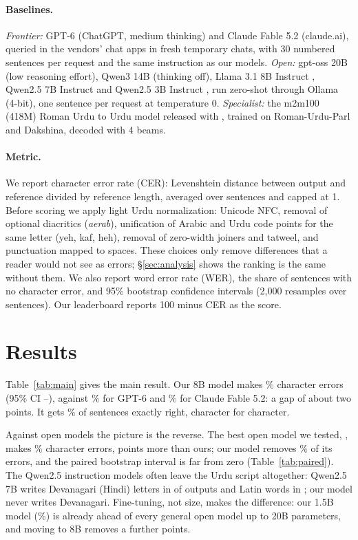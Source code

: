 \documentclass[11pt]{article}
\begin{document}
\paragraph{Baselines.} \emph{Frontier:} GPT-6 (ChatGPT, medium thinking) and Claude Fable 5.2 (claude.ai), queried in the vendors' chat apps in fresh temporary chats, with 30 numbered sentences per request and the same instruction as our models. \emph{Open:} gpt-oss 20B (low reasoning effort), Qwen3 14B \citep{yang2025qwen3} (thinking off), Llama 3.1 8B Instruct \citep{grattafiori2024llama3}, Qwen2.5 7B Instruct and Qwen2.5 3B Instruct \citep{qwen2025qwen25}, run zero-shot through Ollama (4-bit), one sentence per request at temperature 0. \emph{Specialist:} the m2m100 (418M) Roman Urdu to Urdu model released with \citet{butt2025translit}, trained on Roman-Urdu-Parl and Dakshina, decoded with 4 beams.

\paragraph{Metric.}\label{sec:metric} We report character error rate (CER): Levenshtein distance between output and reference divided by reference length, averaged over sentences and capped at 1. Before scoring we apply light Urdu normalization: Unicode NFC, removal of optional diacritics (\textit{aerab}), unification of Arabic and Urdu code points for the same letter (yeh, kaf, heh), removal of zero-width joiners and tatweel, and punctuation mapped to spaces. These choices only remove differences that a reader would not see as errors; \S\ref{sec:analysis} shows the ranking is the same without them. We also report word error rate (WER), the share of sentences with no character error, and 95\% bootstrap confidence intervals (2{,}000 resamples over sentences). Our leaderboard reports 100 minus CER as the score.

\section{Results}\label{sec:results}



Table~\ref{tab:main} gives the main result. Our 8B model makes \OursCER\% character errors (95\% CI \OursCIlo--\OursCIhi), against \GptCER\% for GPT-6 and \FableCER\% for Claude Fable 5.2: a gap of about two points. It gets \OursExact\% of sentences exactly right, character for character.

Against open models the picture is the reverse. The best open model we tested, \BestOpenName, makes \BestOpenCER\% character errors, \MarginOpen points more than ours; our model removes \ErrCut\% of its errors, and the paired bootstrap interval is far from zero (Table~\ref{tab:paired}). The Qwen2.5 instruction models often leave the Urdu script altogether: Qwen2.5 7B writes Devanagari (Hindi) letters in \QsevenDeva of \NTest outputs and Latin words in \QsevenLatin; our model never writes Devanagari. Fine-tuning, not size, makes the difference: our 1.5B model (\SmallCER\%) is already ahead of every general open model up to 20B parameters, and moving to 8B removes a further \SmallToBigCER points.
\end{document}
